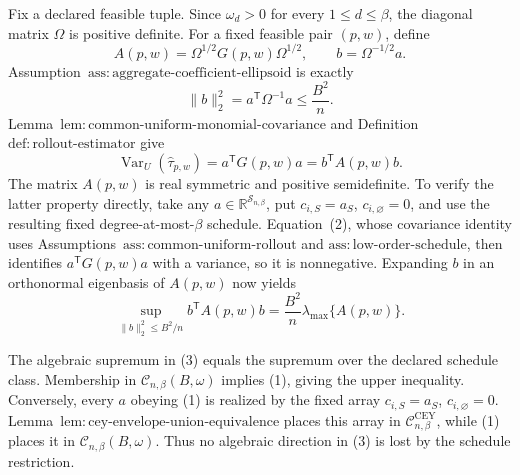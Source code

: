 Fix a declared feasible tuple.  Since \(\omega_d>0\) for every \(1\le d\le\beta\), the diagonal matrix \(\Omega\) is positive definite.  For a fixed feasible pair \((p,w)\), define
\[
A(p,w)=\Omega^{1/2}G(p,w)\Omega^{1/2},
\qquad b=\Omega^{-1/2}a.
\]
Assumption~\(\mathrm{ass{:}aggregate\text{-}coefficient\text{-}ellipsoid}\) is exactly
\[
\lVert b\rVert_2^2=a^{\mathsf T}\Omega^{-1}a\le \frac{B^2}{n}.
\tag{1}
\]
Lemma~\(\mathrm{lem{:}common\text{-}uniform\text{-}monomial\text{-}covariance}\) and Definition~\(\mathrm{def{:}rollout\text{-}estimator}\) give
\[
\operatorname{Var}_U(\widehat\tau_{p,w})
=a^{\mathsf T}G(p,w)a
=b^{\mathsf T}A(p,w)b.
\tag{2}
\]
The matrix \(A(p,w)\) is real symmetric and positive semidefinite.  To verify the latter property directly, take any \(a\in\mathbb R^{\mathcal S_{n,\beta}}\), put \(c_{i,S}=a_S\), \(c_{i,\varnothing}=0\), and use the resulting fixed degree-at-most-\(\beta\) schedule.  Equation~(2), whose covariance identity uses Assumptions~\(\mathrm{ass{:}common\text{-}uniform\text{-}rollout}\) and \(\mathrm{ass{:}low\text{-}order\text{-}schedule}\), then identifies \(a^{\mathsf T}G(p,w)a\) with a variance, so it is nonnegative.  Expanding \(b\) in an orthonormal eigenbasis of \(A(p,w)\) now yields
\[
\sup_{\lVert b\rVert_2^2\le B^2/n}b^{\mathsf T}A(p,w)b
=\frac{B^2}{n}\lambda_{\max}\{A(p,w)\}.
\tag{3}
\]

The algebraic supremum in (3) equals the supremum over the declared schedule class.  Membership in \(\mathcal C_{n,\beta}(B,\omega)\) implies (1), giving the upper inequality.  Conversely, every \(a\) obeying (1) is realized by the fixed array \(c_{i,S}=a_S\), \(c_{i,\varnothing}=0\).  Lemma~\(\mathrm{lem{:}cey\text{-}envelope\text{-}union\text{-}equivalence}\) places this array in \(\mathcal C^{\mathrm{CEY}}_{n,\beta}\), while (1) places it in \(\mathcal C_{n,\beta}(B,\omega)\).  Thus no algebraic direction in (3) is lost by the schedule restriction.

